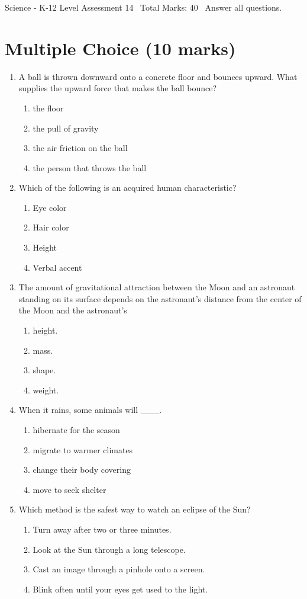 \documentclass[12pt]{article}
\begin{document}
\begin{center}
Science - K-12 Level Assessment 14 \
Total Marks: 40 \
Answer all questions.
\end{center}

\section*{Multiple Choice (10 marks)}
\begin{enumerate}[label=\arabic*.]
\item A ball is thrown downward onto a concrete floor and bounces upward. What supplies the upward force that makes the ball bounce?
\begin{enumerate}[label=(\alph*)]
    \item the floor
    \item the pull of gravity
    \item the air friction on the ball
    \item the person that throws the ball
\end{enumerate}
\item Which of the following is an acquired human characteristic?
\begin{enumerate}[label=(\alph*)]
    \item Eye color
    \item Hair color
    \item Height
    \item Verbal accent
\end{enumerate}
\item The amount of gravitational attraction between the Moon and an astronaut standing on its surface depends on the astronaut's distance from the center of the Moon and the astronaut's
\begin{enumerate}[label=(\alph*)]
    \item height.
    \item mass.
    \item shape.
    \item weight.
\end{enumerate}
\item When it rains, some animals will \_\_\_.
\begin{enumerate}[label=(\alph*)]
    \item hibernate for the season
    \item migrate to warmer climates
    \item change their body covering
    \item move to seek shelter
\end{enumerate}
\item Which method is the safest way to watch an eclipse of the Sun?
\begin{enumerate}[label=(\alph*)]
    \item Turn away after two or three minutes.
    \item Look at the Sun through a long telescope.
    \item Cast an image through a pinhole onto a screen.
    \item Blink often until your eyes get used to the light.
\end{enumerate}
\end{enumerate}
\end{document}
